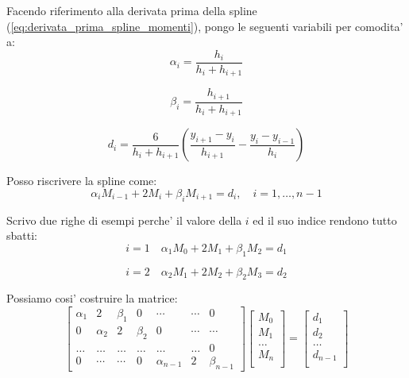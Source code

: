 Facendo riferimento alla derivata prima della spline (\ref{eq:derivata_prima_spline_momenti}),
pongo le seguenti variabili per comodita' a:
\begin{equation}
  \alpha_i = \frac{h_i}{h_i + h_{i+1}}
\end{equation}

\begin{equation}
  \beta_i = \frac{h_{i+1}}{h_i + h_{i+1}}
\end{equation}

\begin{equation}
  d_i = \frac{6}{h_i + h_{i+1}}(\frac{y_{i+1} - y_i}{h_{i+1}} - \frac{y_i - y_{i-1}}{h_i})
\end{equation}

Posso riscrivere la spline come:
\begin{equation}
  \alpha_i M_{i-1} + 2M_i + \beta_i M_{i+1} = d_i, \quad i = 1, \dots, n-1
\end{equation}


Scrivo due righe di esempi perche' il valore della $i$ ed il suo indice rendono tutto sbatti:
\begin{equation*}
  i = 1 \quad   \alpha_1 M_{0} + 2M_1 + \beta_1 M_{2} = d_1
\end{equation*}

\begin{equation*}
  i = 2 \quad   \alpha_2 M_{1} + 2M_2 + \beta_2 M_{3} = d_2
\end{equation*}

Possiamo cosi' costruire la matrice:
\begin{equation}
  \begin{bmatrix}
    \alpha_1 & 2 & \beta_1 & 0 & \cdots & \cdots & 0 \\
    0 & \alpha_2 & 2 & \beta_2 & 0 & \cdots & \cdots \\
    \dots & \dots& \dots& \dots& \dots& \dots& 0\\
    0 & \cdots & \cdots & 0 & \alpha_{n-1} & 2 & \beta_{n-1}
  \end{bmatrix}
  \begin{bmatrix}
    M_0 \\
    M_1 \\
    \dots \\
    M_n \\
  \end{bmatrix}
  =
  \begin{bmatrix}
    d_1 \\
    d_2 \\
    \dots \\
    d_{n-1} \\
  \end{bmatrix}
\end{equation}

